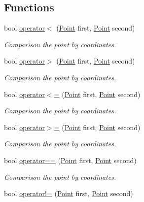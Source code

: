 \subsection*{Functions}
\begin{DoxyCompactItemize}
\item 
bool \mbox{\hyperlink{namespacetdp_aa76700935906dbb491a443a4662d758f}{operator$<$}} (\mbox{\hyperlink{structtdp_1_1_point}{Point}} first, \mbox{\hyperlink{structtdp_1_1_point}{Point}} second)
\begin{DoxyCompactList}\small\item\em Comparison the point by coordinates. \end{DoxyCompactList}\item 
bool \mbox{\hyperlink{namespacetdp_a948b73cf0c6d99e08e145094d83d8e97}{operator$>$}} (\mbox{\hyperlink{structtdp_1_1_point}{Point}} first, \mbox{\hyperlink{structtdp_1_1_point}{Point}} second)
\begin{DoxyCompactList}\small\item\em Comparison the point by coordinates. \end{DoxyCompactList}\item 
bool \mbox{\hyperlink{namespacetdp_a3d677102635fab3ad0088b88378e5b48}{operator$<$=}} (\mbox{\hyperlink{structtdp_1_1_point}{Point}} first, \mbox{\hyperlink{structtdp_1_1_point}{Point}} second)
\begin{DoxyCompactList}\small\item\em Comparison the point by coordinates. \end{DoxyCompactList}\item 
bool \mbox{\hyperlink{namespacetdp_a88169ae92b50b53e80d23d8df9d263d1}{operator$>$=}} (\mbox{\hyperlink{structtdp_1_1_point}{Point}} first, \mbox{\hyperlink{structtdp_1_1_point}{Point}} second)
\begin{DoxyCompactList}\small\item\em Comparison the point by coordinates. \end{DoxyCompactList}\item 
bool \mbox{\hyperlink{namespacetdp_ac28871640d9ee5c6f37f75be07b6d187}{operator==}} (\mbox{\hyperlink{structtdp_1_1_point}{Point}} first, \mbox{\hyperlink{structtdp_1_1_point}{Point}} second)
\begin{DoxyCompactList}\small\item\em Comparison the point by coordinates. \end{DoxyCompactList}\item 
bool \mbox{\hyperlink{namespacetdp_ab1602cb8c233d6ab4a5fa0e12dd219f1}{operator!=}} (\mbox{\hyperlink{structtdp_1_1_point}{Point}} first, \mbox{\hyperlink{structtdp_1_1_point}{Point}} second)

\end{DoxyCompactItemize}
